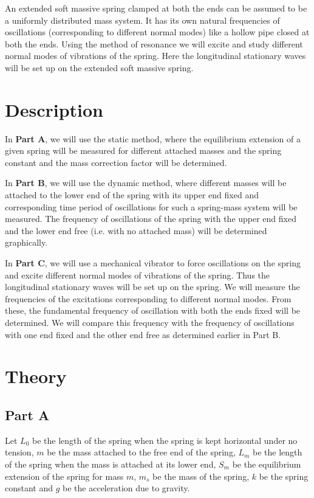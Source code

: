 An extended soft massive spring clamped at both the ends can be assumed to be a uniformly distributed mass system. It has its own natural frequencies of oscillations (corresponding to different normal modes) like a hollow pipe closed at both the ends. Using the method of resonance we will excite and study different normal modes of vibrations of the spring. Here the longitudinal stationary waves will be set up on the extended soft massive spring. 

\section*{Description}

In \textbf{Part A}, we will use the static method, where the equilibrium extension of a given spring will be measured for different attached masses and the spring constant and the mass correction factor will be determined. 

In \textbf{Part B}, we will use the dynamic method, where different masses will be attached to the lower end of the spring with its upper end fixed and corresponding time period of oscillations for such a spring-mass system will be measured. The frequency of oscillations of the spring with the upper end fixed and the lower end free (i.e. with no attached mass) will be determined graphically. 

In \textbf{Part C}, we will use a mechanical vibrator to force oscillations on the spring and excite different normal modes of vibrations of the spring. Thus the longitudinal stationary waves will be set up on the spring. We will measure the frequencies of the excitations corresponding to different normal modes. From these, the fundamental frequency of oscillation with both the ends fixed will be determined. We will compare this frequency with the frequency of oscillations with one end fixed and the other end free as determined earlier in Part B.



\section*{Theory}

\subsection*{Part A}

Let $L_0$ be the length of the spring when the spring is kept horizontal under no tension, $m$ be
the mass attached to the free end of the spring, $L_m$ be the length of the spring when the mass
is attached at its lower end, $S_m$ be the equilibrium extension of the spring for mass $m$, $m_s$ be the mass of the spring, $k$ be the spring constant and $g$ be the acceleration due to gravity.

